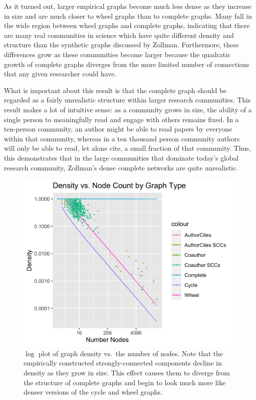 As it turned out, larger empirical graphs become much less dense as they
increase in size and are much closer to wheel graphs than to complete
graphs. Many fall in the wide region between wheel graphs and complete
graphs, indicating that there are many real communities in science which
have quite different density and structure than the synthetic graphs
discussed by Zollman. Furthermore, these differences grow as these
communities become larger because the quadratic growth of complete
graphs diverges from the more limited number of connections that any
given researcher could have.

What is important about this result is that the complete graph should be
regarded as a fairly unrealistic structure within larger research
communities. This result makes a lot of intuitive sense: as a community
grows in size, the ability of a single person to meaningfully read and
engage with others remains fixed. In a ten-person community, an author
might be able to read papers by everyone within that community, whereas
in a ten thousand person community authors will only be able to read,
let alone cite, a small fraction of that community. Thus, this
demonstrates that in the large communities that dominate today's global
research community, Zollman's dense complete networks are quite
unrealistic.

\begin{figure}
\hypertarget{fig:nodesvdensity}{%
\centering
\includegraphics{figures/node_density_plot.png}
\caption{\(\log\) plot of graph density vs.~the number of nodes. Note
that the empirically constructed strongly-connected components decline
in density as they grow in size. This effect causes them to diverge from
the structure of complete graphs and begin to look much more like denser
versions of the cycle and wheel graphs.}\label{fig:nodesvdensity}
}
\end{figure}

